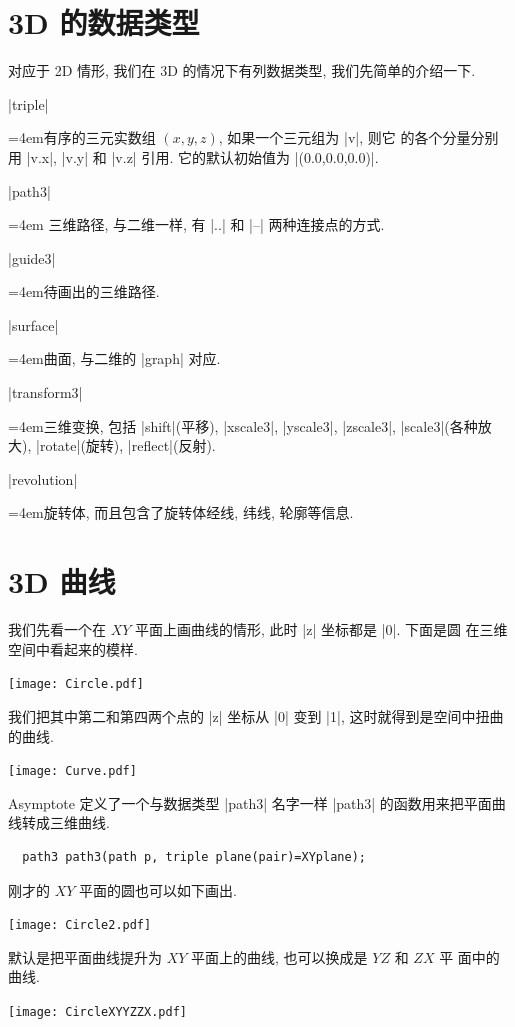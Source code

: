 \documentclass{ctexbook}
\newenvironment{funclist}{\trivlist
  \parindent=0pt
\item[]
  \def\item{\medskip\par\leftskip=0pt}
  \def\go{\par\leftskip=4em}}
{\endtrivlist}
\begin{document}
\section{3D 的数据类型}
对应于 2D 情形, 我们在 3D 的情况下有列数据类型, 我们先简单的介绍一下.
\begin{funclist}
\item  |triple| \go 有序的三元实数组 $(x,y,z)$, 如果一个三元组为 |v|, 则它
  的各个分量分别用 |v.x|, |v.y| 和 |v.z| 引用. 它的默认初始值为 |(0.0,0.0,0.0)|.
\item  |path3| \go
  三维路径, 与二维一样, 有 |..| 和 |--| 两种连接点的方式.
\item  |guide3| \go 待画出的三维路径.
\item |surface| \go 曲面, 与二维的 |graph| 对应.
\item |transform3| \go 三维变换, 包括 |shift|(平移), |xscale3|, |yscale3|,
  |zscale3|, |scale3|(各种放大), |rotate|(旋转), |reflect|(反射).
\item |revolution| \go 旋转体, 而且包含了旋转体经线, 纬线, 轮廓等信息.
\end{funclist}

\section{3D 曲线}
我们先看一个在 $XY$ 平面上画曲线的情形, 此时 |z| 坐标都是 |0|. 下面是圆
在三维空间中看起来的模样.
\begin{center}\texttt{[image: Circle.pdf]}\end{center}%

我们把其中第二和第四两个点的 |z| 坐标从 |0| 变到 |1|, 这时就得到是空间中扭曲
的曲线.
\begin{center}\texttt{[image: Curve.pdf]}\end{center}%


Asymptote 定义了一个与数据类型 |path3| 名字一样 |path3| 的函数用来把平面曲
线转成三维曲线.
\begin{lstlisting}
  path3 path3(path p, triple plane(pair)=XYplane);
\end{lstlisting}

刚才的 $XY$ 平面的圆也可以如下画出.
\begin{center}\texttt{[image: Circle2.pdf]}\end{center}%

默认是把平面曲线提升为 $XY$ 平面上的曲线, 也可以换成是 $YZ$ 和 $ZX$ 平
面中的曲线.
\begin{center}\texttt{[image: CircleXYYZZX.pdf]}\end{center}%

\end{document}
